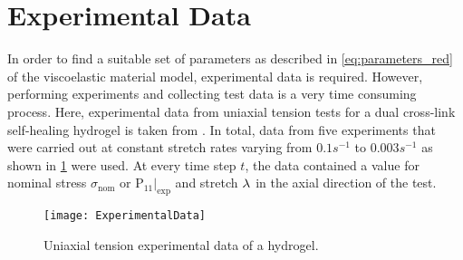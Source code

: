 \section{Experimental Data}
In order to find a suitable set of parameters as described in \cref{eq:parameters_red} of the viscoelastic material model, experimental data is required. However, performing experiments and collecting test data is a very time consuming process. Here, experimental data from uniaxial tension tests for a dual cross-link self-healing hydrogel is taken from \citeauthor{Long2014Oct} \cite{Long2014Oct}. In total, data from five experiments that were carried out at constant stretch rates varying from \(0.1s^{-1}\) to \(0.003s^{-1}\) as shown in \cref{fig:uniaxial_experiments} were used. At every time step \(t\), the data contained a value for nominal stress \(\sigma_{\text{nom}}\) or \(\mathrm{P_{11}}{|}_{\text{exp}}\) and stretch \(\lambda^{}_{{}}\) in the axial direction of the test.
\begin{figure}[htbp]
    \centering
    \texttt{[image: ExperimentalData]}
    \caption[Experimental data for a hydrogel]{Uniaxial tension experimental data of a hydrogel.}%
    \label{fig:uniaxial_experiments}
\end{figure}

